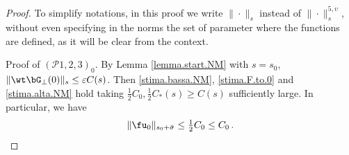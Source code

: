 \documentclass[a4paper,reqno,10pt]{article}
\begin{document}
\begin{proof}
To simplify notations, in this proof we write $\| \cdot \|_s$ instead of $\| \cdot \|_s^{5,\upsilon}$, without even specifying in the norms the set of parameter where the functions are defined, as it will be clear from the context.

\smallskip

\noindent
{\sc Proof of $({\mathcal P}1, 2, 3)_0$}.
By Lemma \ref{lemma.start.NM} with $s=s_0$,
$\| \wt\bG_{\perp}(0) \|_s  \leq \varepsilon C(s)$. Then \eqref{stima.bassa.NM}, \eqref{stima.F.to.0} and \eqref{stima.alta.NM} hold taking $ \tfrac12 C_0, \tfrac12C_*(s) \geq C(s)$ sufficiently large. In particular, we have
\begin{equation}\label{stima.w0}
	\| \fu_{0} \|_{s_0+\bar\sigma} \leq \tfrac12 C_0 \leq C_0\,.
\end{equation}

\smallskip


\end{proof}
\end{document}
